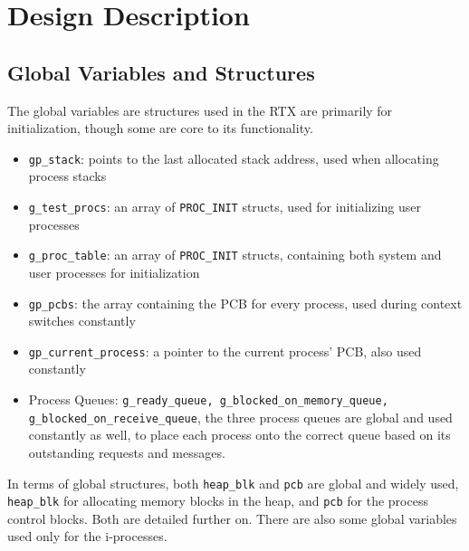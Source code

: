 \documentclass[12pt]{report}
\begin{document}
\chapter{Design Description}

\section{Global Variables and Structures}

The global variables are structures used in the RTX are primarily for initialization, though
some are core to its functionality.
\begin{itemize}
	\item \texttt{gp\_stack}: points to the last allocated stack address, used when allocating process stacks
	\item \texttt{g\_test\_procs}: an array of \texttt{PROC\_INIT} structs, used for initializing user processes
	\item \texttt{g\_proc\_table}: an array of \texttt{PROC\_INIT} structs, containing both system and user processes for initialization
	\item \texttt{gp\_pcbs}: the array containing the PCB for every process, used during context switches constantly
	\item \texttt{gp\_current\_process}: a pointer to the current process' PCB, also used constantly
	\item Process Queues: \texttt{g\_ready\_queue, g\_blocked\_on\_memory\_queue, g_blocked_on_receive_queue},
		the three process queues are global and used constantly as well, to place each process
		onto the correct queue based on its outstanding requests and messages.
\end{itemize}
In terms of global structures, both \texttt{heap\_blk} and \texttt{pcb} are global
and widely used, \texttt{heap\_blk} for allocating memory blocks in the heap, and
\texttt{pcb} for the process control blocks. Both are detailed further on.
There are also some global variables used only for the i-processes.
\end{document}
